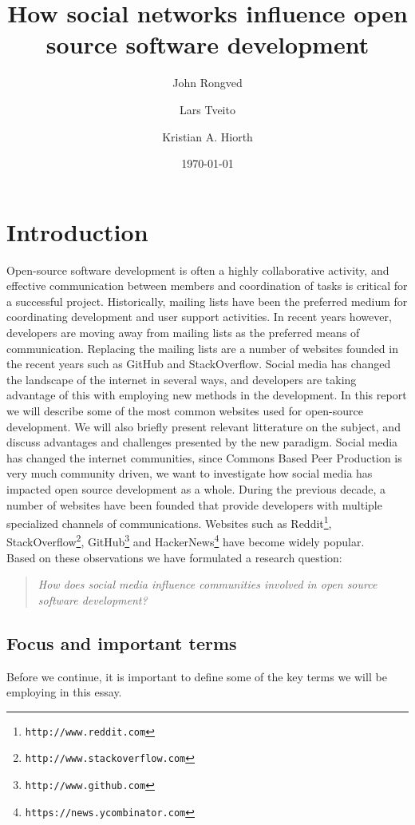 \documentclass[a4paper,11pt]{article} %
\title{How social networks influence open source software development}
\date{\today}
\author{John Rongved \and Lars Tveito \and Kristian A. Hiorth}
\begin{document}
\ififorside{}

\tableofcontents{}

\section{Introduction}

Open-source software development is often a highly collaborative activity, and effective communication 
between members and coordination of tasks is critical for a successful project. 
Historically, mailing lists have been the preferred medium for coordinating development
and user support activities\cite{Vasilescu14StackOverflow}. In recent years however, 
developers are moving away from mailing lists as the preferred means of communication.
Replacing the mailing lists are a number of websites founded in the recent years such
as GitHub and StackOverflow. Social media has changed the landscape of the internet in
several ways, and developers are taking advantage of this with employing new methods
in the development. In this report we will describe some of the most common
websites used for open-source development. We will also briefly present relevant 
litterature on the subject, and discuss advantages and challenges presented by
the new paradigm. Social media has changed the internet communities, since 
Commons Based Peer Production is very much community driven, we want to investigate how
social media has impacted open source development as a whole.
During the previous decade, a number of websites have been founded that 
provide developers with multiple
specialized channels of communications. Websites such as
Reddit\footnote{\texttt{http://www.reddit.com}},
StackOverflow\footnote{\texttt{http://www.stackoverflow.com}},
GitHub\footnote{\texttt{http://www.github.com}} and
HackerNews\footnote{\texttt{https://news.ycombinator.com}} have become
widely popular. 
\\
Based on these observations we have formulated a research question:

\begin{quote}
\textit{How does social media influence communities involved in open source software development?}
\end{quote}

\subsection{Focus and important terms}
Before we continue, it is important to define some of the key terms we will be employing
in this essay. 
\end{document}
